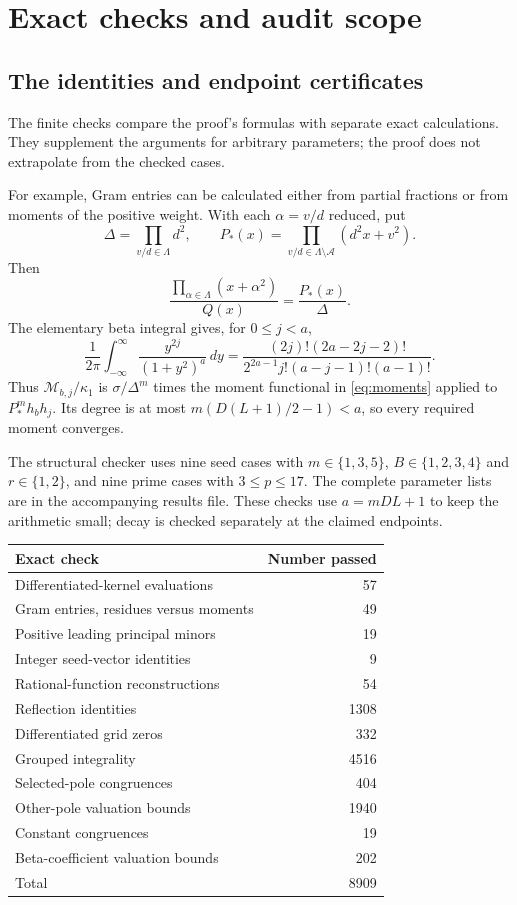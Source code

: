 \section{Exact checks and audit scope}\label{app:checks}

\subsection{The identities and endpoint certificates}

The finite checks compare the proof's formulas with separate exact
calculations. They supplement the arguments for arbitrary parameters;
the proof does not extrapolate from the checked cases.

For example, Gram entries can be calculated either from partial
fractions or from moments of the positive weight. With each
$\alpha=v/d$ reduced, put
\[
 \Delta=\prod_{v/d\in\Lambda}d^2,\qquad
 P_*(x)=\prod_{v/d\in\Lambda\setminus\mathcal A}(d^2x+v^2).
\]
Then
\[
 \frac{\prod_{\alpha\in\Lambda}(x+\alpha^2)}{Q(x)}
                           =\frac{P_*(x)}{\Delta}.
\]
The elementary beta integral gives, for $0\le j<a$,
\begin{equation}\label{eq:moments}
 \frac1{2\pi}\int_{-\infty}^{\infty}
       \frac{y^{2j}}{(1+y^2)^a}\,dy
 =\frac{(2j)!(2a-2j-2)!}
        {2^{2a-1}j!(a-j-1)!(a-1)!}.
\end{equation}
Thus $\mathcal M_{b,j}/\kappa_1$ is $\sigma/\Delta^m$ times the
moment functional in \eqref{eq:moments} applied to
$P_*^m h_bh_j$. Its degree is at most
$m(D(L+1)/2-1)<a$, so every required moment converges.

The structural checker uses nine seed cases with $m\in\{1,3,5\}$,
$B\in\{1,2,3,4\}$ and $r\in\{1,2\}$, and nine prime cases
with $3\le p\le17$. The complete parameter lists are in the
accompanying results file. These checks use $a=mDL+1$ to keep
the arithmetic small; decay is checked separately at the claimed
endpoints.
\begin{center}
\begin{tabular}{@{}lr@{}}
\toprule
Exact check&Number passed\\
\midrule
Differentiated-kernel evaluations&57\\
Gram entries, residues versus moments&49\\
Positive leading principal minors&19\\
Integer seed-vector identities&9\\
Rational-function reconstructions&54\\
Reflection identities&1308\\
Differentiated grid zeros&332\\
Grouped integrality&4516\\
Selected-pole congruences&404\\
Other-pole valuation bounds&1940\\
Constant congruences&19\\
Beta-coefficient valuation bounds&202\\
\midrule
Total&8909\\
\bottomrule
\end{tabular}
\end{center}

